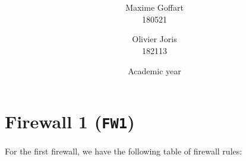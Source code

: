 \documentclass[a4paper, 11pt, oneside]{article}
\title{\ClassName\\\vspace*{0.8cm}\ProjectName\vspace{1cm}}
\author{Maxime Goffart \\180521 \and Olivier Joris\\182113}
\date{\vspace{1cm}Academic year \AcademicYear}
\begin{document}

\begin{titlingpage}
{\let\newpage\relax\maketitle}
\end{titlingpage}

\newpage


\section{Firewall 1 (\texttt{FW1})}
\paragraph{}For the first firewall, we have the following table of firewall rules:
\end{document}

